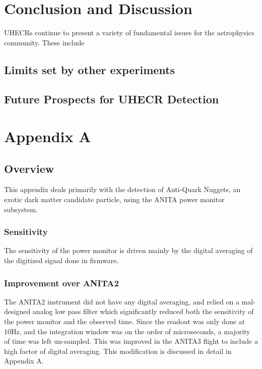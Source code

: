 			
\chapter{Conclusion and Discussion}
	UHECRs continue to present a variety of fundamental issues for the astrophysics community.  These include 
\section{Limits set by other experiments}

\section{Future Prospects for UHECR Detection}


	
			
			
			
			
\chapter{Appendix A}
\section{Overview}
	This appendix deals primarily with the detection of Anti-Quark Nuggets, an exotic dark matter candidate particle, using the ANITA power monitor subsystem.
	
	
	\subsection{Sensitivity}
		The sensitivity of the power monitor is driven mainly by the digital averaging of the digitized signal done in firmware.
	\subsection{Improvement over ANITA2}
		The ANITA2 instrument did not have any digital averaging, and relied on a mal-designed analog low pass filter which significantly reduced both the sensitivity of the power monitor and the observed time.  Since the readout was only done at 10Hz, and the integration window was on the order of microseconds, a majority of time was left un-sampled.  This was improved in the ANITA3 flight to include a high factor of digital averaging.  This modification is discussed in detail in Appendix A.
	
	
	

